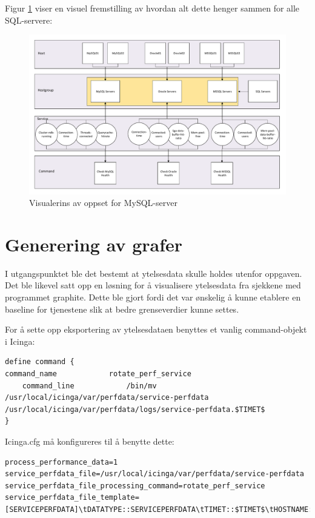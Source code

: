 Figur \ref{sql} viser en visuel fremstilling av hvordan alt dette henger sammen for alle SQL-servere:

\begin{figure}
    \centering
    \includegraphics[scale=0.6]{img/sql}
    \caption{Visualerins av oppset for MySQL-server}
    \label{sql}
\end{figure}



\section{Generering av grafer}
I utgangspunktet ble det bestemt at ytelsesdata skulle holdes utenfor oppgaven. Det ble likevel satt opp en løsning for å visualisere ytelsesdata fra sjekkene med programmet graphite. Dette ble gjort fordi det var ønskelig å kunne etablere en baseline for tjenestene slik at bedre grenseverdier kunne settes.

For å sette opp eksportering av ytelsesdataen benyttes et vanlig command-objekt i Icinga:

\begin{lstlisting}
define command {
command_name            rotate_perf_service
    command_line            /bin/mv /usr/local/icinga/var/perfdata/service-perfdata /usr/local/icinga/var/perfdata/logs/service-perfdata.$TIMET$
}
\end{lstlisting}
 Icinga.cfg må konfigureres til å benytte dette:

\begin{lstlisting}
process_performance_data=1
service_perfdata_file=/usr/local/icinga/var/perfdata/service-perfdata
service_perfdata_file_processing_command=rotate_perf_service
service_perfdata_file_template=[SERVICEPERFDATA]\tDATATYPE::SERVICEPERFDATA\tTIMET::$TIMET$\tHOSTNAME::$HOSTNAME$\tSERVICEDESC::$SERVICEDESC$\tSERVICEPERFDATA::$SERVICEPERFDATA$service_perfdata_file_processing_interval=200
\end{lstlisting}

